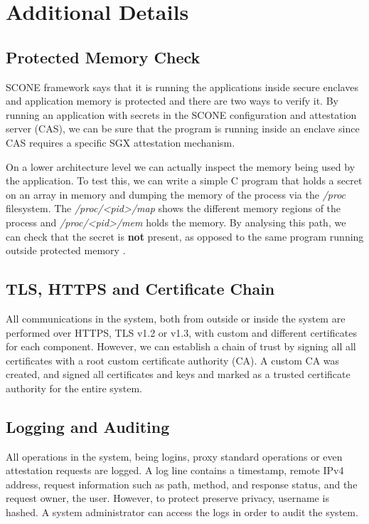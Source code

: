 \section{Additional Details}
\label{sec:additional_details}

\subsection{Protected Memory Check}
\label{ssec:protected_memory_check}

SCONE framework says that it is running the applications inside secure enclaves and application memory is protected and there are two ways to verify it. By running an application with secrets in the SCONE configuration and attestation server (\gls{CAS}), we can be sure that the program is running inside an enclave since CAS requires a specific \gls{SGX} attestation mechanism. 

On a lower architecture level we can actually inspect the memory being used by the application. To test this, we can write a simple C program that holds a secret on an array in memory and dumping the memory of the process via the \textit{/proc} filesystem. The \textit{/proc/<pid>/map} shows the different memory regions of the process and \textit{/proc/<pid>/mem} holds the memory. By analysing this path, we can check that the secret is \textbf{not} present, as opposed to the same program running outside protected memory \cite{scone:debug}.

\subsection{TLS, HTTPS and Certificate Chain}
\label{ssec:tls_https_certificate_chain}

All communications in the system, both from outside or inside the system are performed over \gls{HTTPS}, \gls{TLS} v1.2 or v1.3, with custom and different certificates for each component. However, we can establish a chain of trust by signing all all certificates with a root custom certificate authority (\gls{CA}). A custom \gls{CA} was created, and signed all certificates and keys and marked as a trusted certificate authority for the entire system.

\subsection{Logging and Auditing} 
\label{sec:logging_and_auditing}

All operations in the system, being logins, proxy standard operations or even attestation requests are logged. A log line contains a timestamp, remote \gls{IP}v4 address, request information such as path, method, and response status, and the request owner, the user. However, to protect preserve privacy, username is hashed. A system administrator can access the logs in order to audit the system.

